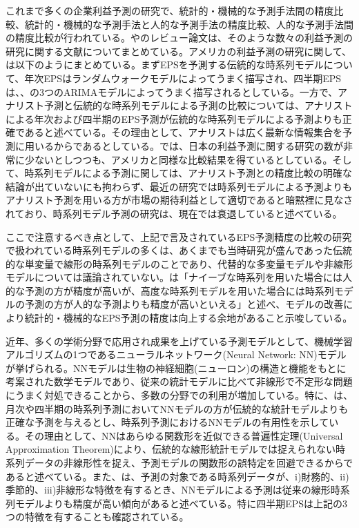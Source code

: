 \documentclass[a4paper, 12pt]{jsarticle}
\begin{document}
これまで多くの企業利益予測の研究で、統計的・機械的な予測手法間の精度比較、統計的・機械的な予測手法と人的な予測手法の精度比較、人的な予測手法間の精度比較が行われている。\cite{sakurai1990}や\cite{ota2006}のレビュー論文は、そのような数々の利益予測の研究に関する文献についてまとめている。アメリカの利益予測の研究に関して、\cite{sakurai1990}は以下のようにまとめている。まずEPSを予測する伝統的な時系列モデルについて、年次EPSはランダムウォークモデルによってうまく描写され、四半期EPSは\cite*{brown1979univariate}、\cite{griffin1977time}、\cite{foster1977quarterly}の3つのARIMAモデルによってうまく描写されるとしている。一方で、アナリスト予測と伝統的な時系列モデルによる予測の比較については、アナリストによる年次および四半期のEPS予測が伝統的な時系列モデルによる予測よりも正確であると述べている。その理由として、アナリストは広く最新な情報集合を予測に用いるからであるとしている。\cite{ota2006}では、日本の利益予測に関する研究の数が非常に少ないとしつつも、アメリカと同様な比較結果を得ているとしている。そして、時系列モデルによる予測に関しては、アナリスト予測との精度比較の明確な結論が出ていないにも拘わらず、最近の研究では時系列モデルによる予測よりもアナリスト予測を用いる方が市場の期待利益として適切であると暗黙裡に見なされており、時系列モデル予測の研究は、現在では衰退していると述べている。

ここで注意するべき点として、上記で言及されているEPS予測精度の比較の研究で扱われている時系列モデルの多くは、あくまでも当時研究が盛んであった伝統的な単変量で線形の時系列モデルのことであり、代替的な多変量モデルや非線形モデルについては議論されていない。\cite{ota2006}は「ナイーブな時系列を用いた場合には人的な予測の方が精度が高いが、高度な時系列モデルを用いた場合には時系列モデルの予測の方が人的な予測よりも精度が高いといえる」と述べ、モデルの改善により統計的・機械的なEPS予測の精度は向上する余地があること示唆している。

近年、多くの学術分野で応用され成果を上げている予測モデルとして、機械学習アルゴリズムの1つであるニューラルネットワーク(Neural Network: NN)モデルが挙げられる。NNモデルは生物の神経細胞(ニューロン)の構造と機能をもとに考案された数学モデルであり、従来の統計モデルに比べて非線形で不定形な問題にうまく対処できることから、多数の分野での利用が増加している\citep*{tkavc2016artificial}。特に、\cite{hill1996neural}は、月次や四半期の時系列予測においてNNモデルの方が伝統的な統計モデルよりも正確な予測を与えるとし、時系列予測におけるNNモデルの有用性を示している。その理由として、NNはあらゆる関数形を近似できる普遍性定理(Universal Approximation Theorem)\citep{hornik1989multilayer}により、伝統的な線形統計モデルでは捉えられない時系列データの非線形性を捉え、予測モデルの関数形の誤特定を回避できるからであると述べている。また、\cite{hill1994artificial}は、予測の対象である時系列データが、i)財務的、ii)季節的、iii)非線形な特徴を有するとき、NNモデルによる予測は従来の線形時系列モデルよりも精度が高い傾向があると述べている。特に四半期EPSは上記の3つの特徴を有することも確認されている\citep*{hopwood1986univariate}。
\end{document}
